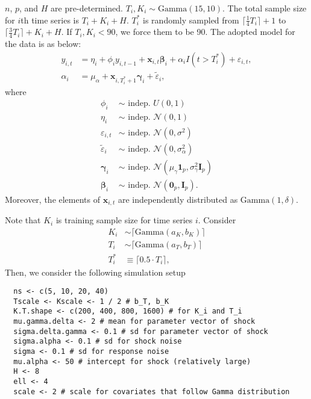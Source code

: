 \documentclass[12pt]{article}
\def\mbf#1{\mathbf{#1}} %
\def\mrm#1{\mathrm{#1}} %
\def\mc#1{\mathcal{#1}} %
\def\mc#1{\mathcal{#1}}
\def\bs#1{\boldsymbol{#1}}
\newcommand{\ceil}[1]{\lceil #1 \rceil}
\theoremstyle{definition}
\theoremstyle{definition}
\begin{document}
$n$, $p$, and $H$ are pre-determined. $T_i, K_i \sim \mrm{Gamma}(15, 10)$.  The total sample size for $i$th time series is $T_i + K_i + H$. $T_i^*$ is randomly sampled from $\ceil{\frac{1}{4}T_i}+1$ to $\ceil{\frac{3}{4} T_i} + K_i+ H$. If $T_i, K_i < 90$, we force them to be 90. The adopted model for the data is as below:
\begin{align*}
  y_{i,t} &= \eta_i + \phi_i y_{i,t-1} + \mbf{x}_{i,t} \bs{\beta}_i + \alpha_i I(t > T_i^*) + \varepsilon_{i,t},\\
  \alpha_i &= \mu_{\alpha} + \mbf{x}_{i,T_i^*+1}\bs{\gamma}_i + \tilde{\varepsilon}_{i},
\end{align*}
where
\begin{align*}
  \phi_i & \sim \text{ indep. }  U(0,1) \\
  \eta_i & \sim \text{ indep. }  \mc{N}(0,1) \\
  \varepsilon_{i,t} & \sim \text{ indep. } \mc{N}(0, \sigma^2)\\
  \tilde{\varepsilon}_i & \sim \text{ indep. } \mc{N}(0, \sigma_{\alpha}^2)
  \\
  \bs{\gamma}_i & \sim \text{ indep. } \mc{N}(\mu_{\gamma}\bs{1}_p, \sigma_{\gamma}^2 \mbf{I}_p) \\
  \bs{\beta}_i & \sim \text{ indep. }  \mc{N}(\bs{0}_p, \mbf{I}_p).
\end{align*}
Moreover, the elements of $\mathbf{x}_{i,t}$ are independently distributed as $\mrm{Gamma}(1,\delta)$.

Note that $K_i$ is training sample size for time series $i$. Consider
\begin{align*}
  K_i & \sim \ceil{\mrm{Gamma}(a_{K}, b_K)}\\
   T_i & \sim \ceil{\mrm{Gamma}(a_{T}, b_T)} \\
  T_i^* &\equiv \ceil{0.5 \cdot T_i},
\end{align*}
 Then, we consider the following simulation setup
\begin{verbatim}
  ns <- c(5, 10, 20, 40)
  Tscale <- Kscale <- 1 / 2 # b_T, b_K 
  K.T.shape <- c(200, 400, 800, 1600) # for K_i and T_i
  mu.gamma.delta <- 2 # mean for parameter vector of shock
  sigma.delta.gamma <- 0.1 # sd for parameter vector of shock
  sigma.alpha <- 0.1 # sd for shock noise  
  sigma <- 0.1 # sd for response noise
  mu.alpha <- 50 # intercept for shock (relatively large)
  H <- 8 
  ell <- 4
  scale <- 2 # scale for covariates that follow Gamma distribution
\end{verbatim}
\end{document}
